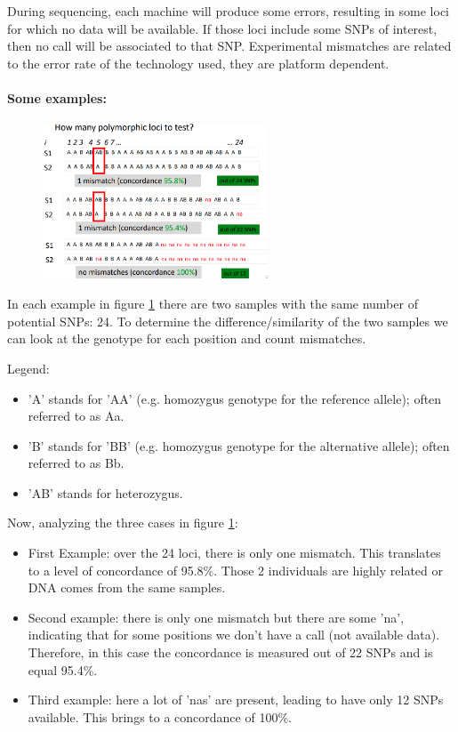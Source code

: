 During sequencing, each machine will produce some errors, resulting in some loci for which no data will be available. If those loci include some SNPs of interest, then no call will be associated to that SNP.
Experimental mismatches are related to the error rate of the technology used, they are platform dependent.

\paragraph*{Some examples:}

\begin{figure}[H]
	\centering
	\includegraphics[width=0.6\textwidth]{SNP.PNG}
	\caption{}
	\label{fig:SNP}
\end{figure}

In each example in figure \ref{fig:SNP} there are two samples with the same number of potential SNPs: 24. To determine the difference/similarity of the two samples we can look at the genotype for each position and count mismatches.

Legend: \\
\begin{itemize}
\item 'A' stands for 'AA' (e.g. homozygus genotype for the reference allele); often referred to as Aa.
\item 'B' stands for 'BB' (e.g. homozygus genotype for the alternative allele); often referred to as Bb.
\item 'AB' stands for heterozygus.
\end{itemize}

Now, analyzing the three cases in figure \ref{fig:SNP}:
\begin{itemize}
	\item First Example: over the 24 loci, there is only one mismatch. This translates to a level of concordance of 95.8\%. Those 2 individuals are highly related or DNA comes from the same samples.
	\item Second example: there is only one mismatch but there are some 'na', indicating that for some positions we don't have a call (not available data). Therefore, in this case the concordance is measured out of 22 SNPs and is equal 95.4\%.
	\item Third example: here a lot of 'nas' are present, leading to have only 12 SNPs available. This brings to a concordance of 100\%.
\end{itemize}

